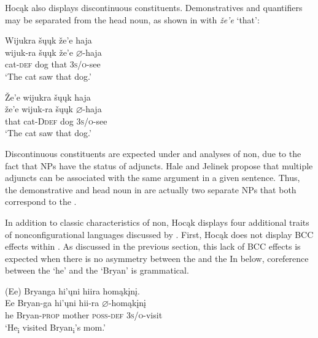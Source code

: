 \documentclass[output=paper]{LSP/langsci}
\begin{document}
Hocąk also displays discontinuous constituents. Demonstratives and quantifiers may be separated from the head noun, as shown in  with \textit{\v{z}e'e} `that': 

\ea\label{ex:jrs:15}
\ea \label{ex:jrs:15a}
\glll Wijukra	\v{s}\k{u}\k{u}k	\v{z}e'e	haja \\
wijuk-ra	\v{s}\k{u}\k{u}k	\v{z}e'e	$\varnothing$-haja \\
	cat-\textsc{def} 	dog	that		\textsc{3s/o}-see\\
\trans `The cat saw that dog.' 

\ex \label{ex:jrs:15b}
\glll \v{Z}e'e	wijukra	 \v{s}\k{u}\k{u}k	haja \\
\v{z}e'e	wijuk-ra	\v{s}\k{u}\k{u}k	$\varnothing$-haja \\
that cat-D\textsc{def} dog \textsc{3s/o}-see \\
\trans `The cat saw that dog.'
\z 
\z 

Discontinuous constituents are expected under  and  analyses of non, due to the fact that NPs have the status of adjuncts. Hale and Jelinek propose that multiple adjuncts can be associated with the same argument in a given sentence. Thus, the demonstrative and head noun in  are actually two separate NPs that both correspond to the .

In addition to  classic characteristics of non, Hocąk displays four additional traits of nonconfigurational languages discussed by \citet{Baker1996}. First, Hocąk does not display BCC effects within .  As discussed in the previous section, this lack of BCC effects is expected when there is no asymmetry between the  and the  In  below, coreference between the  `he' and the  `Bryan' is grammatical.

\begin{exe}
\ex\label{ex:jrs:16}	
\glll (Ee) 	Bryanga 			hi'\k{u}ni 	hiira 				homąk\k{i}n\k{i}. \\
Ee 		Bryan-ga 		hi'\k{u}ni 	hii-ra 			$\varnothing$-homąk\k{i}n\k{i} \\
he 		Bryan-\textsc{prop} mother 	\textsc{poss-def} 	\textsc{3s/o}-visit  \\
\trans `He\textsubscript{i} visited Bryan\textsubscript{i}'s mom.'
\end{exe}
 
\end{document}
